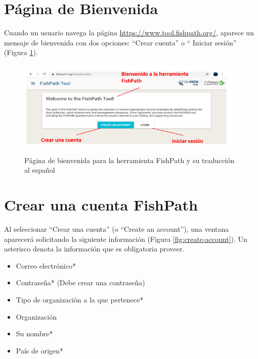 \documentclass[
  11pt,
]{book}
\providecommand{\tightlist}{%
  \setlength{\itemsep}{0pt}\setlength{\parskip}{0pt}}
\begin{document}
\hypertarget{puxe1gina-de-bienvenida}{%
\section{Página de Bienvenida}\label{puxe1gina-de-bienvenida}}

Cuando un usuario navega la página \url{https://www.tool.fishpath.org/}, aparece un mensaje de bienvenida con dos opciones: ``Crear cuenta'' o `` Iniciar sesión'' (Figura \ref{fig:welcome}).

\begin{figure}

{\centering \includegraphics[width=0.95\linewidth]{images/welcome-page-es} 

}

\caption{Página de bienvenida para la herramienta FishPath y su traducción al español }\label{fig:welcome}
\end{figure}

\hypertarget{crear-una-cuenta-fishpath}{%
\section{Crear una cuenta FishPath}\label{crear-una-cuenta-fishpath}}

Al seleccionar ``Crear una cuenta'' (o ``Create an account''), una ventana aparecerá solicitando la siguiente información (Figura \ref{fig:create-account}). Un asterisco denota la información que es obligatoria proveer.

\begin{itemize}
\tightlist
\item
  Correo electrónico*
\item
  Contraseña* (Debe crear una contraseña)
\item
  Tipo de organización a la que pertenece*
\item
  Organización
\item
  Su nombre*
\item
  País de origen*
\end{itemize}
\end{document}

